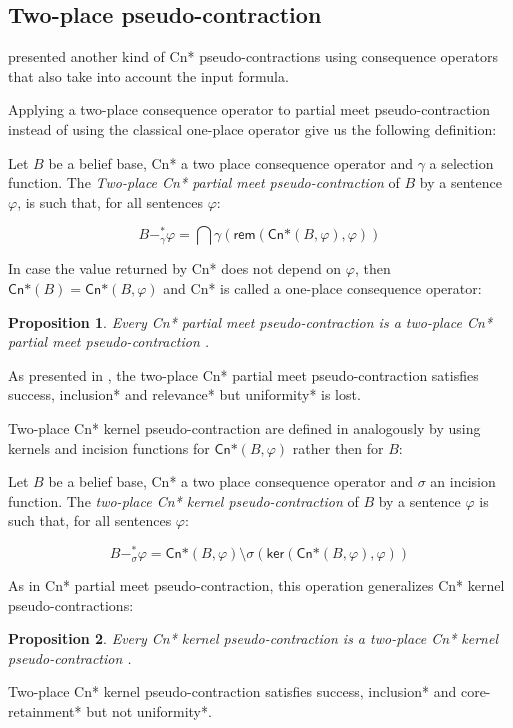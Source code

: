 \subsection{Two-place pseudo-contraction}

\citeauthor{Matos2021} presented another kind of \textsf{Cn*} pseudo-contractions using consequence operators that also take into account the input formula. 

Applying a two-place consequence operator to partial meet pseudo-contraction instead of using the classical one-place operator give us the following definition:

\begin{definition}
    Let $B$ be a belief base, \textsf{Cn*} a two place consequence operator and $\gamma$ a selection function. The \textit{Two-place \textsf{Cn*} partial meet pseudo-contraction} of $B$ by a sentence $\varphi$, is such that, for all sentences $\varphi$:

    $$B -^{*}_{\gamma} \varphi = \bigcap \gamma(\textsf{rem}(\textsf{Cn*}(B, \varphi), \varphi))$$
\end{definition}

In case the value returned by \textsf{Cn*} does not depend on $\varphi$, then $\textsf{Cn*}(B) = \textsf{Cn*}(B, \varphi)$ and \textsf{Cn*} is called a one-place consequence operator:

\newtheorem{proposition}{Proposition}[chapter]

\begin{proposition}
    Every \textsf{Cn*} partial meet pseudo-contraction is a two-place \textsf{Cn*} partial meet pseudo-contraction \citep{Santos2018}.
\end{proposition}

As presented in \citet{Santos2018}, the two-place \textsf{Cn*} partial meet pseudo-contraction satisfies success, inclusion* and relevance* but uniformity* is lost.

Two-place \textsf{Cn*} kernel pseudo-contraction are defined in \citet{Matos2021} analogously by using kernels and incision functions for $\textsf{Cn*}(B, \varphi)$ rather then for $B$:

\begin{definition}
    Let $B$ be a belief base, \textsf{Cn*} a two place consequence operator and $\sigma$ an incision function. The \textit{two-place \textsf{Cn*} kernel pseudo-contraction} of $B$ by a sentence $\varphi$ is such that, for all sentences $\varphi$:

    $$B -^{*}_{\sigma} \varphi = \textsf{Cn*}(B, \varphi) \setminus \sigma(\textsf{ker}(\textsf{Cn*}(B, \varphi), \varphi))$$
\end{definition}

As in \textsf{Cn*} partial meet pseudo-contraction, this operation generalizes \textsf{Cn*} kernel pseudo-contractions:

\begin{proposition}
    Every \textsf{Cn*} kernel pseudo-contraction is a two-place \textsf{Cn*} kernel pseudo-contraction \citep{Santos2018}.
\end{proposition}

Two-place \textsf{Cn*} kernel pseudo-contraction satisfies success, inclusion* and core-retainment* but not uniformity*.